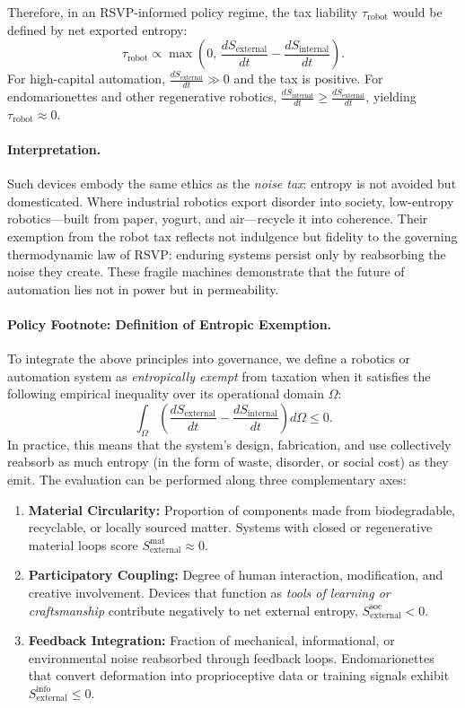 \documentclass[12pt]{article}
\begin{document}
Therefore, in an RSVP-informed policy regime, the tax liability $\tau_{\text{robot}}$ would be defined by net exported entropy:
\[
\tau_{\text{robot}} \propto \max\!\left(0,\,\frac{dS_{\text{external}}}{dt} - \frac{dS_{\text{internal}}}{dt}\right).
\]
For high-capital automation, $\frac{dS_{\text{external}}}{dt} \gg 0$ and the tax is positive. For endomarionettes and other regenerative robotics, $\frac{dS_{\text{internal}}}{dt} \ge \frac{dS_{\text{external}}}{dt}$, yielding $\tau_{\text{robot}} \approx 0$.

\paragraph{Interpretation.}
Such devices embody the same ethics as the \emph{noise tax}: entropy is not avoided but domesticated. Where industrial robotics export disorder into society, low-entropy robotics—built from paper, yogurt, and air—recycle it into coherence. Their exemption from the robot tax reflects not indulgence but fidelity to the governing thermodynamic law of RSVP: enduring systems persist only by reabsorbing the noise they create. These fragile machines demonstrate that the future of automation lies not in power but in permeability.

\paragraph{Policy Footnote: Definition of Entropic Exemption.}
To integrate the above principles into governance, we define a robotics or automation system as \emph{entropically exempt} from taxation when it satisfies the following empirical inequality over its operational domain $\Omega$:
\[
\int_{\Omega} \left(\frac{dS_{\text{external}}}{dt} - \frac{dS_{\text{internal}}}{dt}\right) d\Omega \le 0.
\]
In practice, this means that the system's design, fabrication, and use collectively reabsorb as much entropy (in the form of waste, disorder, or social cost) as they emit. The evaluation can be performed along three complementary axes:
\begin{enumerate}[label=(\roman*)]
    \item \textbf{Material Circularity:} Proportion of components made from biodegradable, recyclable, or locally sourced matter. Systems with closed or regenerative material loops score $S_{\text{external}}^{\text{mat}} \approx 0$.
    \item \textbf{Participatory Coupling:} Degree of human interaction, modification, and creative involvement. Devices that function as \emph{tools of learning or craftsmanship} contribute negatively to net external entropy, $S_{\text{external}}^{\text{soc}} < 0$.
    \item \textbf{Feedback Integration:} Fraction of mechanical, informational, or environmental noise reabsorbed through feedback loops. Endomarionettes that convert deformation into proprioceptive data or training signals exhibit $S_{\text{external}}^{\text{info}} \le 0$.
\end{enumerate}
\end{document}
